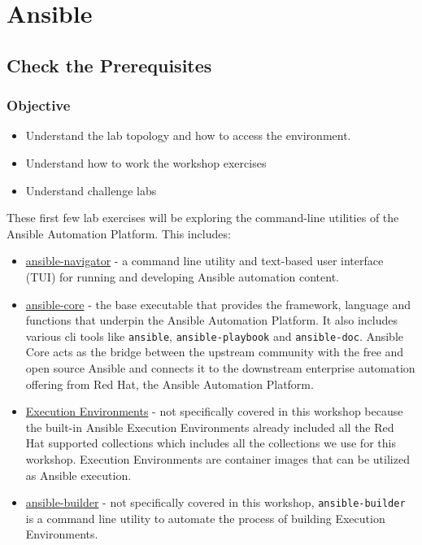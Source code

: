 \chapter{Ansible}
\hypertarget{check-the-prerequisites}{%
\section{Check the Prerequisites}\label{check-the-prerequisites}}

\hypertarget{objective}{%
\subsection{Objective}\label{objective}}

\begin{itemize}
  \item Understand the lab topology and how to access the environment.
  \item Understand how to work the workshop exercises
  \item Understand challenge labs
\end{itemize}

These first few lab exercises will be exploring the command-line utilities of the Ansible Automation Platform. This includes:

\begin{itemize}
  \item \href{https://github.com/ansible/ansible-navigator}{ansible-navigator} - a command line utility and text-based user interface (TUI) for running and developing Ansible automation content.
  \item \href{https://docs.ansible.com/core.html}{ansible-core} - the base executable that provides the framework, language and functions that underpin the Ansible Automation Platform. It also includes various cli tools like \texttt{ansible}, \texttt{ansible-playbook} and \texttt{ansible-doc}. Ansible Core acts as the bridge between the upstream community with the free and open source Ansible and connects it to the downstream enterprise automation offering from Red Hat, the Ansible Automation Platform.
\item
  \href{https://docs.ansible.com/automation-controller/latest/html/userguide/execution_environments.html}{Execution
  Environments} - not specifically covered in this workshop because the
  built-in Ansible Execution Environments already included all the Red
  Hat supported collections which includes all the collections we use
  for this workshop. Execution Environments are container images that
  can be utilized as Ansible execution.
\item
  \href{https://github.com/ansible/ansible-builder}{ansible-builder} -
  not specifically covered in this workshop, \texttt{ansible-builder} is
  a command line utility to automate the process of building Execution
  Environments.
\end{itemize}

